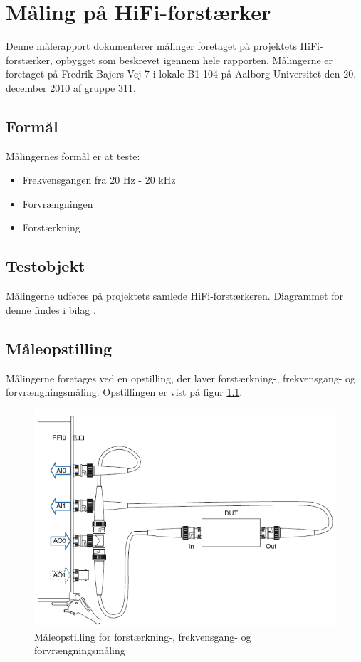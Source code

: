 \chapter{Måling på HiFi-forstærker}
\label{maaling_hifi}
Denne målerapport dokumenterer målinger foretaget på projektets HiFi-forstærker, opbygget som beskrevet igennem hele rapporten. Målingerne er foretaget på Fredrik Bajers Vej 7 i lokale B1-104 på Aalborg Universitet den 20. december 2010 af gruppe 311.

\section*{Formål}
Målingernes formål er at teste:

\begin{itemize}
\item Frekvensgangen fra 20 Hz - 20 kHz
\item Forvrængningen
\item Forstærkning
\end{itemize}

\section*{Testobjekt}
Målingerne udføres på projektets samlede HiFi-forstærkeren. Diagrammet for denne findes i bilag .

\section*{Måleopstilling}
Målingerne foretages   ved en opstilling, der laver forstærkning-, frekvensgang- og forvrængningsmåling. Opstillingen er vist på figur \ref{fig:maaleop-hifi}.

\begin{figure}[h]
\centering
\includegraphics[scale=0.3]{maalerapporter/forforstaerker/maaleopstilling-thd-forforstaerker.png}
\caption{Måleopstilling for forstærkning-, frekvensgang- og forvrængningsmåling \cite{maaling-mm5}}
\label{fig:maaleop-hifi}
\end{figure}

